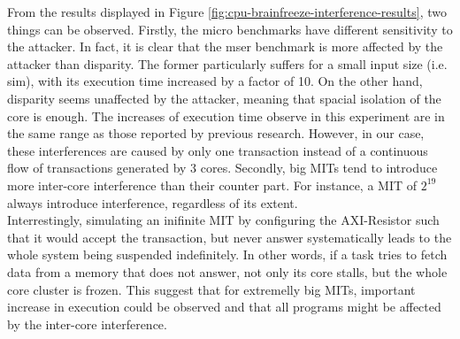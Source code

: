     From the results displayed in Figure \ref{fig:cpu-brainfreeze-interference-results}, two things can be observed.
    Firstly, the micro benchmarks have different sensitivity to the attacker. In fact, it is clear that the mser benchmark is more affected by the attacker than disparity.
    The former particularly suffers for a small input size (i.e. sim), with its execution time increased by a factor of 10.
    On the other hand, disparity seems unaffected by the attacker, meaning that spacial isolation of the core is enough.
    The increases of execution time observe in this experiment are in the same range as those reported by previous research.
    However, in our case, these interferences are caused by only one transaction instead of a continuous flow of transactions generated by 3 cores.
    Secondly, big MITs tend to introduce more inter-core interference than their counter part. For instance, a MIT of $2^{19}$ always introduce interference, regardless of its extent.\\

    Interrestingly, simulating an inifinite MIT by configuring the AXI-Resistor such that it would accept the transaction, but never answer systematically leads to the whole system being suspended indefinitely.
    In other words, if a task tries to fetch data from a memory that does not answer, not only its core stalls, but the whole core cluster is frozen.
    This suggest that for extremelly big MITs, important increase in execution could be observed and that all programs might be affected by the inter-core interference.
